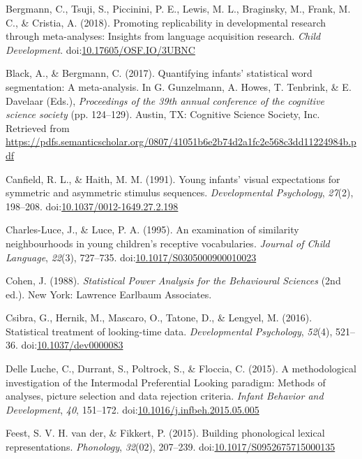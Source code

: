 \documentclass[man]{apa6}
\theoremstyle{definition}
\theoremstyle{definition}
\theoremstyle{definition}
\theoremstyle{remark}
\begin{document}
\hypertarget{ref-Bergmann2018}{}
Bergmann, C., Tsuji, S., Piccinini, P. E., Lewis, M. L., Braginsky, M.,
Frank, M. C., \& Cristia, A. (2018). Promoting replicability in
developmental research through meta-analyses: Insights from language
acquisition research. \emph{Child Development}.
doi:\href{https://doi.org/10.17605/OSF.IO/3UBNC}{10.17605/OSF.IO/3UBNC}

\hypertarget{ref-Black2017}{}
Black, A., \& Bergmann, C. (2017). Quantifying infants' statistical word
segmentation: A meta-analysis. In G. Gunzelmann, A. Howes, T. Tenbrink,
\& E. Davelaar (Eds.), \emph{Proceedings of the 39th annual conference
of the cognitive science society} (pp. 124--129). Austin, TX: Cognitive
Science Society, Inc. Retrieved from
\url{https://pdfs.semanticscholar.org/0807/41051b6e2b74d2a1fc2e568c3dd11224984b.pdf}

\hypertarget{ref-Canfield1991}{}
Canfield, R. L., \& Haith, M. M. (1991). Young infants' visual
expectations for symmetric and asymmetric stimulus sequences.
\emph{Developmental Psychology}, \emph{27}(2), 198--208.
doi:\href{https://doi.org/10.1037/0012-1649.27.2.198}{10.1037/0012-1649.27.2.198}

\hypertarget{ref-CharlesLuce1995}{}
Charles-Luce, J., \& Luce, P. A. (1995). An examination of similarity
neighbourhoods in young children's receptive vocabularies. \emph{Journal
of Child Language}, \emph{22}(3), 727--735.
doi:\href{https://doi.org/10.1017/S0305000900010023}{10.1017/S0305000900010023}

\hypertarget{ref-cohen}{}
Cohen, J. (1988). \emph{Statistical Power Analysis for the Behavioural
Sciences} (2nd ed.). New York: Lawrence Earlbaum Associates.

\hypertarget{ref-Csibra2016}{}
Csibra, G., Hernik, M., Mascaro, O., Tatone, D., \& Lengyel, M. (2016).
Statistical treatment of looking-time data. \emph{Developmental
Psychology}, \emph{52}(4), 521--36.
doi:\href{https://doi.org/10.1037/dev0000083}{10.1037/dev0000083}

\hypertarget{ref-DelleLuche2015}{}
Delle Luche, C., Durrant, S., Poltrock, S., \& Floccia, C. (2015). A
methodological investigation of the Intermodal Preferential Looking
paradigm: Methods of analyses, picture selection and data rejection
criteria. \emph{Infant Behavior and Development}, \emph{40}, 151--172.
doi:\href{https://doi.org/10.1016/j.infbeh.2015.05.005}{10.1016/j.infbeh.2015.05.005}

\hypertarget{ref-vanderFeest2015}{}
Feest, S. V. H. van der, \& Fikkert, P. (2015). Building phonological
lexical representations. \emph{Phonology}, \emph{32}(02), 207--239.
doi:\href{https://doi.org/10.1017/S0952675715000135}{10.1017/S0952675715000135}
\end{document}
